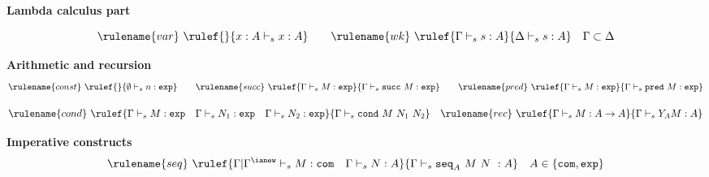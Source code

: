 \newlength{\mylength}
\newenvironment{FramedTable}%
{\begin{table}[htbp]
\begin{Sbox}%
\setlength{\mylength}{\textwidth}%
\addtolength{\mylength}{-2\fboxsep}%
\addtolength{\mylength}{-2\fboxrule}%
\begin{minipage}{\mylength}}%
{\end{minipage}\end{Sbox}\shadowbox{\TheSbox}\end{table}}%



\begin{FramedTable}
 {\bf Lambda calculus part}

$$ \rulename{var} \ \rulef{}{x : A  \vdash_s x : A}
\qquad \rulename{wk} \ \rulef{\Gamma \vdash_s s :
A}{\Delta \vdash_s s : A} \quad \Gamma \subset
\Delta
$$

\begin{center}
\end{center}
\smallskip


{\bf Arithmetic and recursion}
$$ \rulename{const} \ \rulef{}{\emptyset  \vdash_s n :\texttt{exp}}
\qquad \rulename{succ} \ \rulef{\Gamma \vdash_s M:\texttt{exp} }{\Gamma \vdash_s \texttt{succ}\ M:\texttt{exp}}
\qquad \rulename{pred} \ \rulef{\Gamma \vdash_s M:\texttt{exp} }{\Gamma \vdash_s \texttt{pred}\ M:\texttt{exp}}$$

$$
\rulename{cond} \ \rulef{\Gamma\vdash_s M : \texttt{exp} \quad \Gamma\vdash_s N_1 : \texttt{exp} \quad \Gamma\vdash_s N_2 : \texttt{exp} }{\Gamma \vdash_s \texttt{cond}\ M\ N_1\ N_2}
\quad  \rulename{rec} \ \rulef{\Gamma \vdash_s M : A\rightarrow A }{ \Gamma \vdash_s Y_A M : A}$$

{\bf Imperative constructs}
$$ \rulename{seq} \ \rulef{\Gamma| \Gamma^{\ianew} \vdash_s M : \texttt{com} \quad \Gamma \vdash_s N :A}
    {\Gamma \vdash_s \texttt{seq}_A \ M\ N\ : A} \quad A \in \{ \texttt{com}, \texttt{exp}\}$$


\end{FramedTable}
